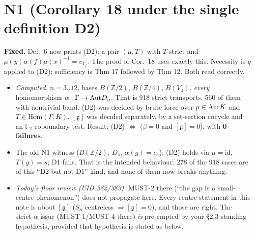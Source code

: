 \documentclass[10pt]{article}
\newcommand{\Z}{\mathbb{Z}}
\begin{document}
\section{N1 (Corollary 18 under the single definition D2)}
\textbf{Fixed.} Def.~6 now prints (D2): a pair $(\mu,T)$ with $T$ strict and $\mu(y)\alpha(f)\mu(x)^{-1}=c_{T_f}$. The proof of Cor.~18 uses exactly this. Necessity is $q$ applied to (D2); sufficiency is Thm 17 followed by Thm 12. Both read correctly.
\begin{itemize}
\item \emph{Computed.} $n=3..12$, bases $B(\Z/2)$, $B(\Z/4)$, $B(V_4)$, \emph{every} homomorphism $\alpha:\Gamma\to\mathrm{Aut} D_n$. That is 918 strict transports, 560 of them with nontrivial band. (D2) was decided by brute force over $\mu\in\mathrm{Aut} K$ and $T\in\mathrm{Hom}(\Gamma,K)$. $[\mathfrak g]$ was decided separately, by a set-section cocycle and an $\mathbb F_2$ coboundary test. Result: (D2) $\iff$ ($\beta=0$ and $[\mathfrak g]=0$), with \textbf{0 failures}.
\item The old N1 witness ($B(\Z/2)$, $D_4$, $\alpha(g)=c_s$): (D2) holds via $\mu=\mathrm{id}$, $T(g)=s$; D1 fails. That is the intended behaviour. 278 of the 918 cases are of this ``D2 but not D1'' kind, and none of them now breaks anything.
\item \emph{Today's floor review (UID 382/383).} MUST-2 there (``the gap is a small-centre phenomenon'') does not propagate here. Every centre statement in this note is about $[\mathfrak g]$ ($S_n$ centreless $\Rightarrow[\mathfrak g]=0$), and those are right. The strict-$\alpha$ issue (MUST-1/MUST-4 there) \emph{is} pre-empted by your \S2.3 standing hypothesis, provided that hypothesis is stated as below.
\end{itemize}
\end{document}
